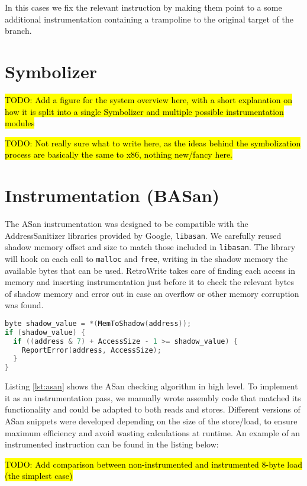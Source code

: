 \documentclass[a4paper,11pt,oneside]{report}
\newcommand{\sysname}{RetroWrite\xspace}
\newcommand{\todo}[1]{%
	\begingroup 
	\sethlcolor{cyan}%
	\hl{TODO: #1}%
	\endgroup
}
\begin{document}
In this cases we fix the relevant instruction by making them point to a some 
additional instrumentation containing a trampoline to the original target of 
the branch. 


\section{Symbolizer}
\todo{Add a figure for the system overview here, with a short explanation on 
how it is split into a single Symbolizer and multiple possible instrumentation 
modules}

\todo{Not really sure what to write here, as the ideas behind the symbolization 
process are basically the same to x86, nothing new/fancy here.}




\section{Instrumentation (BASan)}
The ASan instrumentation was designed to be compatible with the 
AddressSanitizer libraries provided by Google, \texttt{libasan}. We carefully 
reused shadow memory offset and size to match those included in 
\texttt{libasan}. The library will hook on each call to \texttt{malloc} and 
\texttt{free}, writing in the shadow memory the available bytes that can be 
used. \sysname takes care of finding each access in memory and inserting 
instrumentation just before it to check the relevant bytes of shadow memory and 
error out in case an overflow or other memory corruption was found.


\begin{lstlisting}[language=C,label={lst:asan},caption={ASan checking algorithm 
implemented in C}]
byte shadow_value = *(MemToShadow(address));
if (shadow_value) {
  if ((address & 7) + AccessSize - 1 >= shadow_value) {
	ReportError(address, AccessSize);
  }
}
\end{lstlisting}

Listing \ref{lst:asan} shows the ASan checking algorithm in high level. To 
implement it as an instrumentation pass, we manually wrote assembly code that 
matched its functionality and could be adapted to both reads and stores.  
Different versions of ASan snippets were developed depending on the size of the 
store/load, to ensure maximum efficiency and avoid wasting calculations at 
runtime. An example of an instrumented instruction can be found in the listing 
below:

\todo{Add comparison between non-instrumented and instrumented 8-byte load (the 
simplest case)}
\end{document}
